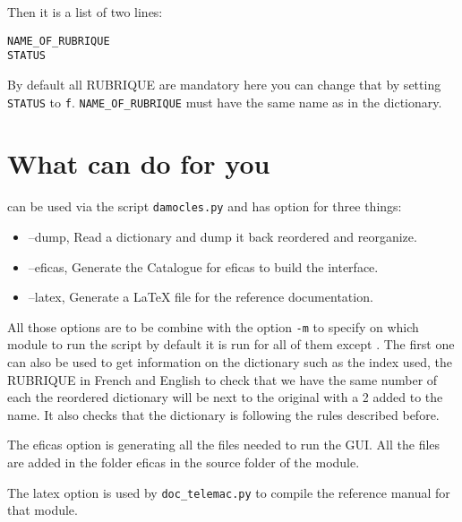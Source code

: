 Then it is a list of two lines:
\begin{verbatim}
NAME_OF_RUBRIQUE
STATUS
\end{verbatim}

By default all RUBRIQUE are mandatory here you can change that by setting
\verb!STATUS! to \verb!f!. \verb!NAME_OF_RUBRIQUE! must have the same name as
in the dictionary.

\section{What \damocles can do for you}

\damocles can be used via the script \verb!damocles.py! and has option for
three things:
\begin{itemize}
\item --dump, Read a dictionary and dump it back reordered and reorganize.
\item --eficas, Generate the Catalogue for eficas to build the interface.
\item --latex, Generate a LaTeX file for the reference documentation.
\end{itemize}
All those options are to be combine with the option \verb!-m! to specify on
which module to run the script by default it is run for all of them except
\mascaret.
The first one can also be used to get information on the dictionary such as the
index used, the RUBRIQUE in French and English to check that we have the same
number of each the reordered dictionary will be next to the original with a 2
added to the name. It also checks that the dictionary is following the rules
described before.

The eficas option is generating all the files needed to run the GUI. All the
files are added in the folder eficas in the source folder of the module.

The latex option is used by \verb!doc_telemac.py! to compile the reference
manual for that module.
